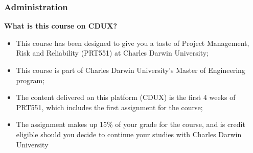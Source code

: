 \documentclass[aspectratio=169]{beamer}
\begin{document}



\begin{frame}
\frametitle{Administration}
\textbf{What is this course on CDUX?}
\begin{itemize}
\item This course has been designed to give you a taste of Project Management, Risk and Reliability (PRT551) at Charles Darwin University;
\item This course is part of Charles Darwin University's Master of Engineering program;
\item The content delivered on this platform (CDUX) is the first 4 weeks of PRT551, which includes the first assignment for the course;
\item The assignment makes up 15\% of your grade for the course, and is credit eligible should you decide to continue your studies with Charles Darwin University 
\end{itemize}
\end{frame}
\end{document}
